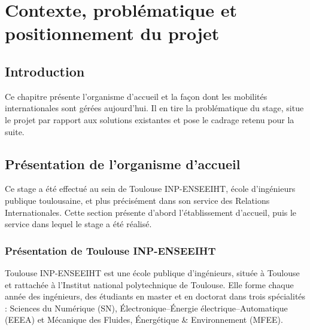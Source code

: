 \chapter{Contexte, problématique et positionnement du projet}
\label{cha:contexte}
\begingroup
\let\clearpage\relax
\startcontents[chapters]
\endgroup
\newpage

\section*{Introduction}
\justifying
{}
{}

Ce chapitre présente l'organisme d'accueil et la façon dont les mobilités internationales sont gérées aujourd'hui. Il en tire la problématique du stage, situe le projet par rapport aux solutions existantes et pose le cadrage retenu pour la suite.

\section{Présentation de l'organisme d'accueil}

Ce stage a été effectué au sein de Toulouse INP-ENSEEIHT, école d'ingénieurs publique toulousaine, et plus précisément dans son service des Relations Internationales. Cette section présente d'abord l'établissement d'accueil, puis le service dans lequel le stage a été réalisé.

\subsection{Présentation de Toulouse INP-ENSEEIHT}

Toulouse INP-ENSEEIHT est une école publique d'ingénieurs, située à Toulouse et rattachée à l'Institut national polytechnique de Toulouse. Elle forme chaque année des ingénieurs, des étudiants en master et en doctorat dans trois spécialités : Sciences du Numérique (SN), Électronique–Énergie électrique–Automatique (EEEA) et Mécanique des Fluides, Énergétique \& Environnement (MFEE).

